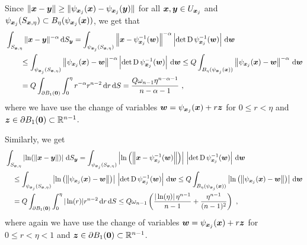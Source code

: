 Since $\displaystyle \|{\bm{x}}-{\bm{y}}\| 
\geq \|\psi_{{\bm{x}}_j}({\bm{x}}) - \psi_{{\bm{x}}_j}({\bm{y}})\|$ for all
$\displaystyle {\bm{x}},{\bm{y}} \in U_{{\bm{x}}_j}$ and
$\displaystyle \psi_{{\bm{x}}_j}(S_{{\bm{x}},\eta}) \subset
B_{\eta}(\psi_{{\bm{x}}_j}({\bm{x}}))$, we get that
\begin{align*}
&\int_{S_{{\bm{x}},\eta}} \|{\bm{x}}-{\bm{y}}\|^{-\alpha} \,\mathrm{d}{S}_{{\bm{y}}}
= \int_{\psi_{{\bm{x}}_j}(S_{{\bm{x}},\eta})}
\left\|{\bm{x}}-\psi_{{\bm{x}}_j}^{-1}({\bm{w}})\right\|^{-\alpha}
\left| \det \operatorname{D} \psi_{{\bm{x}}_j}^{-1}({\bm{w}})\right| \,\mathrm{d}{{\bm{w}}} \\
& \qquad
\leq \int_{\psi_{{\bm{x}}_j}(S_{{\bm{x}},\eta})}
\left\|\psi_{{\bm{x}}_j}({\bm{x}})-{\bm{w}}\right\|^{-\alpha}
\left| \det \operatorname{D} \psi_{{\bm{x}}_j}^{-1}({\bm{w}})\right| \,\mathrm{d}{{\bm{w}}}
\leq Q \int_{B_{\eta}(\psi_{{\bm{x}}_j}({\bm{x}}))}
\left\|\psi_{{\bm{x}}_j}({\bm{x}})-{\bm{w}}\right\|^{-\alpha} \,\mathrm{d}{{\bm{w}}} \\
&\qquad
= Q \int_{\partial B_1({\bm{0}})} \int_0^\eta r^{-\alpha}
r^{n-2} \,\mathrm{d}{r} \,\mathrm{d}{S}
= \frac{ Q \omega_{n-1} \eta^{n-\alpha-1}}{n-\alpha -1} \ ,
\end{align*}
where we have use the change of variables
${\bm{w}} = \psi_{{\bm{x}}_j}({\bm{x}}) + r {\bm{z}}$ for
$0 \leq r < \eta$ and ${\bm{z}} \in \partial B_1({\bm{0}}) \subset \mathbb{R}^{n-1}$.

Similarly, we get
\begin{align*}
&\int_{S_{{\bm{x}},\eta}} \left|\ln(\|{\bm{x}}-{\bm{y}}\|)\right| \,\mathrm{d}{S}_{{\bm{y}}}
= \int_{\psi_{{\bm{x}}_j}(S_{{\bm{x}},\eta})}
\left| \ln\left(\left\|{\bm{x}}
-\psi_{{\bm{x}}_j}^{-1}({\bm{w}})\right\|\right)\right| \,
\left| \det \operatorname{D} \psi_{{\bm{x}}_j}^{-1}({\bm{w}})\right| \,\mathrm{d}{{\bm{w}}} \\
& \quad
\leq \int_{\psi_{{\bm{x}}_j}(S_{{\bm{x}},\eta})}
\left| \ln\left( \left\|\psi_{{\bm{x}}_j}({\bm{x}})-{\bm{w}}\right\|\right)\right|
\, \left| \det \operatorname{D} \psi_{{\bm{x}}_j}^{-1}({\bm{w}})\right| \,\mathrm{d}{{\bm{w}}}
\leq Q \int_{B_{\eta}(\psi_{{\bm{x}}_j}({\bm{x}}))}
\left|\ln\left( \left\|\psi_{{\bm{x}}_j}({\bm{x}})-{\bm{w}}\right\|\right)\right|
\,\mathrm{d}{{\bm{w}}} \\
&\quad
= Q \int_{\partial B_1({\bm{0}})} \int_0^\eta |\ln(r)|
  r^{n-2} \,\mathrm{d}{r} \,\mathrm{d}{S}
\leq Q \omega_{n-1} \left( \frac{|\ln(\eta)|\, \eta^{n-1}}{n-1}  +
  \frac{\eta^{n-1}}{(n-1)^2}  \right) \ ,
\end{align*}
where again we have use the change of variables 
${\bm{w}} = \psi_{{\bm{x}}_j}({\bm{x}}) + r {\bm{z}}$ for
$0 \leq r < \eta <1$ and
${\bm{z}} \in \partial B_1({\bm{0}}) \subset \mathbb{R}^{n-1}$.

